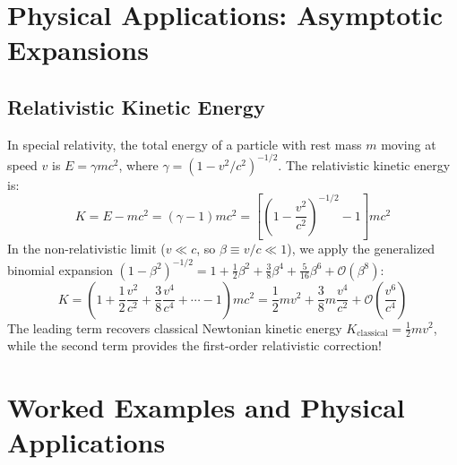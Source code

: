 \section{Physical Applications: Asymptotic Expansions}

\subsection{Relativistic Kinetic Energy}
In special relativity, the total energy of a particle with rest mass $m$ moving at speed $v$ is $E = \gamma m c^2$, where $\gamma = (1 - v^2/c^2)^{-1/2}$. The relativistic kinetic energy is:
\begin{equation}
K = E - mc^2 = (\gamma - 1)mc^2 = \left[\left(1 - \frac{v^2}{c^2}\right)^{-1/2} - 1\right]mc^2
\end{equation}
In the non-relativistic limit ($v \ll c$, so $\beta \equiv v/c \ll 1$), we apply the generalized binomial expansion $(1 - \beta^2)^{-1/2} = 1 + \frac{1}{2}\beta^2 + \frac{3}{8}\beta^4 + \frac{5}{16}\beta^6 + \mathcal{O}(\beta^8)$:
\begin{equation}
K = \left(1 + \frac{1}{2}\frac{v^2}{c^2} + \frac{3}{8}\frac{v^4}{c^4} + \cdots - 1\right)mc^2 = \frac{1}{2}mv^2 + \frac{3}{8}m\frac{v^4}{c^2} + \mathcal{O}\left(\frac{v^6}{c^4}\right)
\end{equation}
The leading term recovers classical Newtonian kinetic energy $K_{\text{classical}} = \frac{1}{2}mv^2$, while the second term provides the first-order relativistic correction!

\section{Worked Examples and Physical Applications}

